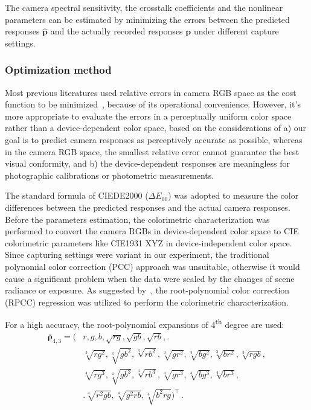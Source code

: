 \documentclass[9pt,twocolumn,twoside]{osajnl}
\begin{document}
The camera spectral sensitivity, the crosstalk coefficients and the nonlinear parameters can be estimated by minimizing the errors between the predicted responses $\hat{\mathbf{p}}$ and the actually recorded responses $\mathbf{p}$ under different capture settings.

\subsubsection{Optimization method}\label{sec:optimization method}

Most previous literatures used relative errors in camera RGB space as the cost function to be minimized~\cite{Urban:10,Barnard:02,Finlayson:98,Huynh:14,Ebner:07,Prasad:13}, because of its operational convenience. However, it’s more appropriate to evaluate the errors in a perceptually uniform color space rather than a device-dependent color space, based on the considerations of a) our goal is to predict camera responses as perceptively accurate as possible, whereas in the camera RGB space, the smallest relative error cannot guarantee the best visual conformity, and b) the device-dependent responses are meaningless for photographic calibrations or photometric measurements.

The standard formula of CIEDE2000 ($\Delta{}E_{00}$) was adopted to measure the color differences between the predicted responses and the actual camera responses. Before the parameters estimation, the colorimetric characterization was performed to convert the camera RGBs in device-dependent color space to CIE colorimetric parameters like CIE1931 XYZ in device-independent color space. Since capturing settings were variant in our experiment, the traditional polynomial color correction (PCC) approach was unsuitable, otherwise it would cause a significant problem when the data were scaled by the changes of scene radiance or exposure. As suggested by~\cite{Finlayson:15}, the root-polynomial color correction (RPCC) regression was utilized to perform the colorimetric characterization.

For a high accuracy, the root-polynomial expansions of 4\textsuperscript{th} degree are used:
\begin{equation}
\begin{split}
\bar{\boldsymbol{\rho}}_{4,3} = \biggl(& r, g, b, \sqrt{rg}, \sqrt{gb}, \sqrt{rb},\biggr. \\
& \sqrt[3]{rg^2}, \sqrt[3]{gb^2}, \sqrt[3]{rb^2}, \sqrt[3]{gr^2}, \sqrt[3]{bg^2}, \sqrt[3]{br^2}, \sqrt[3]{rgb}, \\
& \sqrt[4]{rg^3}, \sqrt[4]{gb^3}, \sqrt[4]{rb^3}, \sqrt[4]{gr^3}, \sqrt[4]{bg^3}, \sqrt[4]{br^3}, \\
& \biggl.\sqrt[4]{r^2gb}, \sqrt[4]{g^2rb}, \sqrt[4]{b^2rg}\biggr)^\intercal\,.
\end{split}
\label{eq:11}
\end{equation}
\end{document}
